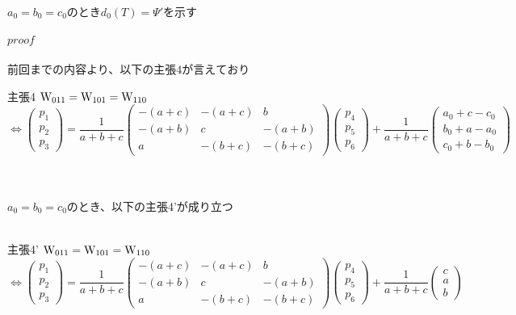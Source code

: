\documentclass[12pt]{jsarticle}
\begin{document}
$a_0=b_0=c_0のときd_0(T)=\Psi 'を示す$\\\\
$proof$\\\\
前回までの内容より、$以下の主張4が言えており$
\begin{itembox}[l]{主張4}
${\rm W_{011}}={\rm W_{101}}={\rm W_{110}} $
{\scriptsize  \[\Leftrightarrow
\left(
\begin{array}{c}
p_1 \\
p_2 \\
p_3
\end{array}
\right)
=
\frac{1}{a+b+c}
\left(
\begin{array}{ccc}
-(a+c) & -(a+c) & b \\
-(a+b)  & c  & -(a+b) \\
a   & -(b+c) & -(b+c)
\end{array}
\right)
\left(
\begin{array}{c}
p_4 \\
p_5 \\
p_6
\end{array}
\right)
+
\frac{1}{a+b+c}
\left(
\begin{array}{c}
a_0+c-c_0 \\
b_0+a-a_0 \\
c_0+b-b_0
\end{array}
\right)
\]}
\end{itembox}\\\\
$a_0=b_0=c_0$のとき、以下の主張4'が成り立つ\\\\
\begin{itembox}[l]{主張4'}
${\rm W_{011}}={\rm W_{101}}={\rm W_{110}} $
{\scriptsize  \[\Leftrightarrow
\left(
\begin{array}{c}
p_1 \\
p_2 \\
p_3
\end{array}
\right)
=
\frac{1}{a+b+c}
\left(
\begin{array}{ccc}
-(a+c) & -(a+c) & b \\
-(a+b)  & c  & -(a+b) \\
a   & -(b+c) & -(b+c)
\end{array}
\right)
\left(
\begin{array}{c}
p_4 \\
p_5 \\
p_6
\end{array}
\right)
+
\frac{1}{a+b+c}
\left(
\begin{array}{c}
c \\
a \\
b
\end{array}
\right)
\]}
\end{itembox}\\\\
\end{document}

